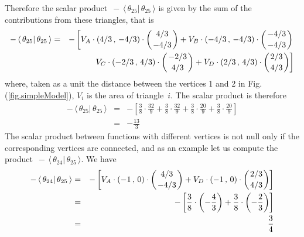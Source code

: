 \documentclass[11pt]{article}
\newcommand{\ivc}[1]{\,\langle\,#1|}
\begin{document}
Therefore the scalar product $\,-\ivc{\theta_{25}} \, \theta_{25} \,\rangle$ is
given by the sum of the contributions from these triangles, that is
\begin{eqnarray}
-\ivc{\theta_{25}} \, \theta_{25} \,\rangle & = & 
-\left[ 
V_A \cdot
(4/3 \,,\, -4/3) \cdot
\left( 
{4/3 \atop -4/3} 
\right) 
+ 
V_B \cdot
(-4/3 \,,\, -4/3) \cdot
\left( 
{-4/3 \atop -4/3} 
\right)
\right. 
\nonumber \\
&& 
\left.
V_C \cdot
(-2/3 \,,\, 4/3) \cdot
\left( 
{-2/3 \atop 4/3} 
\right) 
+ 
V_D \cdot
(2/3 \,,\, 4/3) \cdot
\left( 
{2/3 \atop 4/3} 
\right)
\right] 
\label{equ.scalarProduct_9_9_a}
\end{eqnarray}
where, taken as a unit the distance between the vertices 1 and 2 in
Fig.(\ref{fig.simpleModel}), $V_i$ is the area of \mbox{triangle $i$}. The
scalar product is therefore  
\begin{eqnarray}
-\ivc{\theta_{25}} \, \theta_{25} \, \rangle & = & -\left[ \frac{3}{8}
  \cdot \frac{32}{9} + \frac{3}{8} \cdot \frac{32}{9} +  \frac{3}{8}
  \cdot \frac{20}{9} + \frac{3}{8} \cdot \frac{20}{9} \right]
\nonumber \\ & = & 
-\frac{13}{3}
\label{equ.scalarProduct_9_9_b}
\end{eqnarray}
The scalar product between functions with different vertices is not
null only if the corresponding vertices are connected, and as an example
let us compute the product $\, -\ivc{\theta_{24}} \, \theta_{25}
\,\rangle$. We have
\begin{eqnarray}
-\ivc{\theta_{24}} \, \theta_{25} \, \rangle 
& = & -\left[ 
V_A \cdot 
(-1 \,,\, 0) 
\cdot \left( 
{4/3 \atop -4/3} 
\right) + 
V_D \cdot 
(-1 \,,\, 0) 
\cdot \left( 
{2/3 \atop 4/3}
\right) 
\right] 
\nonumber \\  &=& 
-\left[ \frac{3}{8} \cdot \left(-\frac{4}{3}\right) + \frac{3}{8} \cdot
  \left(-\frac{2}{3}\right) \right] 
\nonumber \\ &=& \frac{3}{4}
\label{equ.scalarProduct_9_10_a}
\end{eqnarray}
\end{document}
